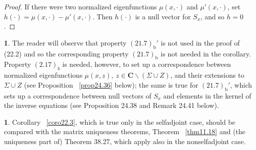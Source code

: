 \documentclass{surv-l}
\theoremstyle{plain}
\theoremstyle{definition}
\newtheorem{remark}[theorem]{\sc{Remark}}
\numberwithin{equation}{chapter}
\begin{document}
\begin{proof}
If there were two normalized eigenfunctions $\mu(x,\cdot)$ and $\mu'(x,\cdot)$, set $h(\cdot)=\mu(x, \cdot)-\mu'(x, \cdot)$. Then $h(\cdot)$ is a null vector for $S_{x}$, and so $h=0$.
\end{proof}

\begin{remark}\label{rem22.4}
The reader will observe that property $(21.7)_{\mathrm{b}}'$ is not used in the proof of (22.2) and so the corresponding property $(21.7)_{\mathrm{b}}$ is not needed in the corollary. Property $(2.17)_{b}$ is needed, however, to set up a correspondence between normalized eigenfunctions $\mu(x, z),\ z\in \textbf{C}\backslash (\Sigma\cup Z)$, and their extensions to $\Sigma\cup Z$ (see Proposition ~\ref{prop24.36} below); the same is true for $(21.7)_{\mathrm{b}}'$, which sets up a correspondence between null vectors of $S_{x}$ and elements in the kernel of the inverse equations (see Proposition 24.38 and Remark 24.41 below).
\end{remark}
\begin{remark}\label{rem22.5}
Corollary ~\ref{coro22.3}, which is true only in the selfadjoint case, should be compared with the matrix uniqueness theorems, Theorem ~\ref{thm11.18} and (the uniqueness part of) Theorem 38.27, which apply also in the nonselfadjoint case.
\end{remark}
\end{document}
